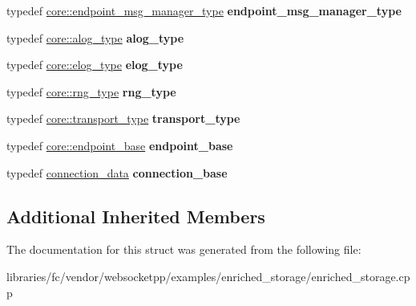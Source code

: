 \begin{DoxyCompactItemize}
\item 
\mbox{\label{structcustom__config_a47fc2091d64f5be16acbf15587f25af9}} 
typedef \mbox{\hyperlink{classwebsocketpp_1_1message__buffer_1_1alloc_1_1endpoint__msg__manager}{core\+::endpoint\+\_\+msg\+\_\+manager\+\_\+type}} {\bfseries endpoint\+\_\+msg\+\_\+manager\+\_\+type}
\item 
\mbox{\label{structcustom__config_aa4765c4c6de021a7de3682018a7f8e0b}} 
typedef \mbox{\hyperlink{classwebsocketpp_1_1log_1_1basic}{core\+::alog\+\_\+type}} {\bfseries alog\+\_\+type}
\item 
\mbox{\label{structcustom__config_aaa6ac45181509874f7f0469004530fa1}} 
typedef \mbox{\hyperlink{classwebsocketpp_1_1log_1_1basic}{core\+::elog\+\_\+type}} {\bfseries elog\+\_\+type}
\item 
\mbox{\label{structcustom__config_a6107db98303c887d15ceb880a6c62622}} 
typedef \mbox{\hyperlink{classwebsocketpp_1_1random_1_1none_1_1int__generator}{core\+::rng\+\_\+type}} {\bfseries rng\+\_\+type}
\item 
\mbox{\label{structcustom__config_a8ea1acf1c4cf264a0e36c998ba8896db}} 
typedef \mbox{\hyperlink{classwebsocketpp_1_1transport_1_1asio_1_1endpoint}{core\+::transport\+\_\+type}} {\bfseries transport\+\_\+type}
\item 
\mbox{\label{structcustom__config_aecf6c7916dfb86a9c27561ada3ce359d}} 
typedef \mbox{\hyperlink{structwebsocketpp_1_1config_1_1core_a5389422816ef3115fb8b7f4cd92d5ca3}{core\+::endpoint\+\_\+base}} {\bfseries endpoint\+\_\+base}
\item 
\mbox{\label{structcustom__config_adaf44f05360e52fd2fa26f4e45eeaec4}} 
typedef \mbox{\hyperlink{structconnection__data}{connection\+\_\+data}} {\bfseries connection\+\_\+base}
\end{DoxyCompactItemize}
\subsection*{Additional Inherited Members}


The documentation for this struct was generated from the following file\+:\begin{DoxyCompactItemize}
\item 
libraries/fc/vendor/websocketpp/examples/enriched\+\_\+storage/enriched\+\_\+storage.\+cpp\end{DoxyCompactItemize}

